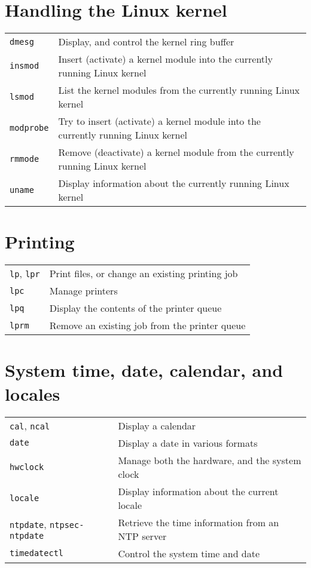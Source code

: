 \documentclass[10pt]{article}
\begin{document}
\begin{multicols}{2}
\section{Handling the Linux kernel}
\begin{tabular}{ p{2.5cm} p{8.5cm} }
  \hline
  \texttt{dmesg} & Display, and control the kernel ring buffer\\
  \rowcolor{Gray}
  \texttt{insmod} & Insert (activate) a kernel module into the currently running Linux kernel\\
  \texttt{lsmod} & List the kernel modules from the currently running Linux kernel \\
  \rowcolor{Gray}
  \texttt{modprobe} & Try to insert (activate) a kernel module into the currently running Linux kernel \\
  \texttt{rmmode} & Remove (deactivate) a kernel module from the currently running Linux kernel \\
  \rowcolor{Gray}
  \texttt{uname} & Display information about the currently running Linux kernel\\
  \hline
\end{tabular}

\section{Printing}
\begin{tabular}{ p{2.5cm} p{8.5cm} }
  \hline
  \texttt{lp}, \texttt{lpr} & Print files, or change an existing printing job\\
  \rowcolor{Gray}
  \texttt{lpc} & Manage printers \\
  \texttt{lpq} & Display the contents of the printer queue\\
  \rowcolor{Gray}
  \texttt{lprm} & Remove an existing job from the printer queue \\
  \hline
\end{tabular}

\section{System time, date, calendar, and locales}
\begin{tabular}{ p{2.5cm} p{8.5cm} }
  \hline
  \texttt{cal}, \texttt{ncal} & Display a calendar\\
  \rowcolor{Gray}
  \texttt{date} & Display a date in various formats\\
  \texttt{hwclock} & Manage both the hardware, and the system clock\\
  \rowcolor{Gray}
  \texttt{locale} & Display information about the current locale \\
  \texttt{ntpdate}, \texttt{ntpsec-ntpdate} & Retrieve the time information from an NTP server \\
  \rowcolor{Gray}
  \texttt{timedatectl} & Control the system time and date \\
  \hline
\end{tabular}
\end{multicols}
\end{document}
